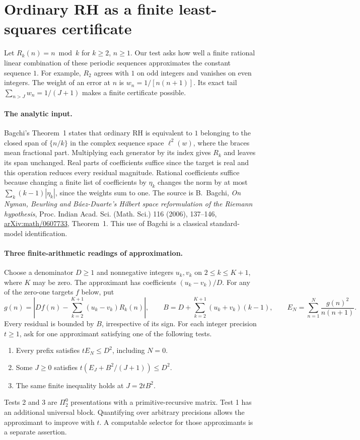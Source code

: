 \section{Ordinary RH as a finite least-squares certificate}\label{sec:residue-space}

Let $R_k(n)=n\bmod k$ for $k\ge2$, $n\ge1$. Our test asks how well a
finite rational linear combination of these periodic sequences approximates
the constant sequence $1$. For example, $R_2$ agrees with $1$ on odd
integers and vanishes on even integers. The weight of an error at $n$ is
$w_n=1/[n(n+1)]$. Its exact tail $\sum_{n>J}w_n=1/(J+1)$ makes
a finite certificate possible.

\paragraph{The analytic input.}
Bagchi's Theorem~1 states that ordinary RH is equivalent to $1$ belonging
to the closed span of $\{n/k\}$ in the complex sequence space
$\ell^2(w)$, where the braces mean fractional part. Multiplying each
generator by its index gives $R_k$ and leaves its span unchanged. Real
parts of coefficients suffice since the target is real and this operation
reduces every residual magnitude. Rational coefficients suffice because changing a finite list of coefficients by $\eta_k$ changes the norm by at
most $\sum_k(k-1)|\eta_k|$, since the weights sum to one. The source is
B.~Bagchi, \emph{On Nyman, Beurling and B\'aez-Duarte's Hilbert space
reformulation of the Riemann hypothesis}, Proc. Indian Acad. Sci.
(Math. Sci.) 116 (2006), 137--146,
\href{https://arxiv.org/abs/math/0607733}{arXiv:math/0607733}, Theorem~1.
This use of Bagchi is a classical standard-model identification.

\paragraph{Three finite-arithmetic readings of approximation.}
Choose a denominator $D\ge1$ and nonnegative integers $u_k,v_k$ on
$2\le k\le K+1$, where $K$ may be zero. The approximant has coefficients
$(u_k-v_k)/D$. For any of the zero-one targets $f$ below, put
\[
 g(n)=\left|Df(n)-\sum_{k=2}^{K+1}(u_k-v_k)R_k(n)\right|,\qquad
 B=D+\sum_{k=2}^{K+1}(u_k+v_k)(k-1),\qquad
 E_N=\sum_{n=1}^N\frac{g(n)^2}{n(n+1)}.
\]
Every residual is bounded by $B$, irrespective of its sign.
For each integer precision $t\ge1$, ask for one approximant satisfying
one of the following tests.
\begin{enumerate}
\item Every prefix satisfies $tE_N\le D^2$, including $N=0$.
\item Some $J\ge0$ satisfies $t(E_J+B^2/(J+1))\le D^2$.
\item The same finite inequality holds at $J=2tB^2$.
\end{enumerate}
Tests 2 and 3 are $\Pi^0_2$ presentations with a primitive-recursive
matrix. Test 1 has an additional universal block. Quantifying over
arbitrary precisions allows the approximant to improve with $t$. A
computable selector for those approximants is a separate assertion.

